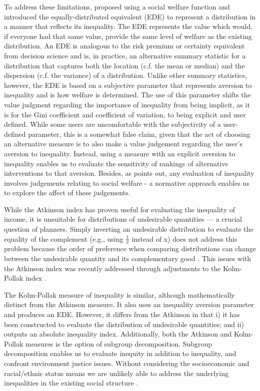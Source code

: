 \documentclass[final,3p,times,onecolumn,sort&compress]{elsarticle}
\begin{document}
To address these limitations, \cite{Atkinson1970-mr} proposed using a social welfare function and introduced the equally-distributed equivalent (EDE) to represent a distribution in a manner that reflects its inequality. 
The EDE represents the value which would, if everyone had that same value, provide the same level of welfare as the existing distribution.
An EDE is analogous to the risk premium or certainty equivalent from decision science and is, in practice, an alternative summary statistic for a distribution that captures both the location (c.f. the mean or median) and the dispersion (c.f. the variance) of a distribution.  
Unlike other summary statistics, however, the EDE is based on a subjective parameter that represents aversion to inequality and is how welfare is determined.
The use of this parameter shifts the value judgment regarding the importance of inequality from being implicit, as it is for the Gini coefficient and coefficient of variation, to being explicit and user defined.
While some users are uncomfortable with the subjectivity of a user-defined parameter, this is a somewhat false claim, given that the act of choosing an alternative measure is to also make a value judgement regarding the user's aversion to inequality. 
Instead, using a measure with an explicit aversion to inequality enables us to evaluate the sensitivity of rankings of alternative interventions to that aversion.
Besides, as \cite{Atkinson1970-mr} points out, any evaluation of inequality involves judgements relating to social welfare - a normative approach enables us to explore the affect of these judgements.

While the Atkinson index has proven useful for evaluating the inequality of income, it is unsuitable for distributions of undesirable quantities \citep{Cox2012-lg, Sheriff2020-ge, Maguire2011-fi} --- a crucial question of planners.
Simply inverting an undesirable distribution to evaluate the equality of the complement (e.g., using $\frac{1}{x}$ instead of x) does not address this problem because the order of preference when comparing distributions can change between the undesirable quantity and its complementary good \citep{Sheriff2020-ge}.
This issues with the Atkinson index was recently addressed through adjustments to the Kolm-Pollak index \citep{Sheriff2020-ge}.

The Kolm-Pollak measure of inequality is similar, although mathematically distinct from the Atkinson measure.
It also uses an inequality aversion parameter and produces an EDE.
However, it differs from the Atkinson in that i) it has been constructed to evaluate the distribution of undesirable quantities; and ii) outputs an absolute inequality index.
Additionally, both the Atkinson and Kolm-Pollak measures is the option of subgroup decomposition. 
Subgroup decomposition enables us to evaluate inequity in addition to inequality, and confront environment justice issues. 
Without considering the socioeconomic and racial/ethnic status means we are unlikely able to address the underlying inequalities in the existing social structure \citep{Talen1998-fl}.
\end{document}
